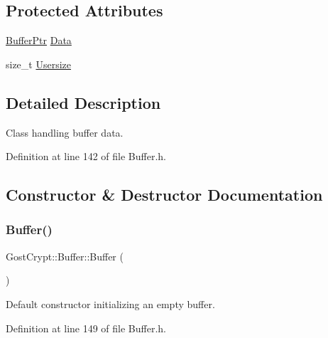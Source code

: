 \subsection*{Protected Attributes}
\begin{DoxyCompactItemize}
\item 
\hyperlink{class_gost_crypt_1_1_buffer_ptr}{Buffer\+Ptr} \hyperlink{class_gost_crypt_1_1_buffer_a3754fa74b60e14928bb353c188a2cbbe}{Data}
\item 
size\+\_\+t \hyperlink{class_gost_crypt_1_1_buffer_a91c9eb26330c4d2b58309f43575d9bd2}{Usersize}
\end{DoxyCompactItemize}


\subsection{Detailed Description}
Class handling buffer data. 

Definition at line 142 of file Buffer.\+h.



\subsection{Constructor \& Destructor Documentation}
\mbox{\label{class_gost_crypt_1_1_buffer_a1cac71b3c018c8f7a3a46be93408fa59}} 
\subsubsection{\texorpdfstring{Buffer()}{Buffer()}\hspace{0.1cm}{\footnotesize\ttfamily [1/3]}}
{\footnotesize\ttfamily Gost\+Crypt\+::\+Buffer\+::\+Buffer (\begin{DoxyParamCaption}{ }\end{DoxyParamCaption})\hspace{0.3cm}{\ttfamily [inline]}}



Default constructor initializing an empty buffer. 



Definition at line 149 of file Buffer.\+h.

\mbox{\label{class_gost_crypt_1_1_buffer_a09ac1c3d1436782956d90f98265a3ae3}} 
